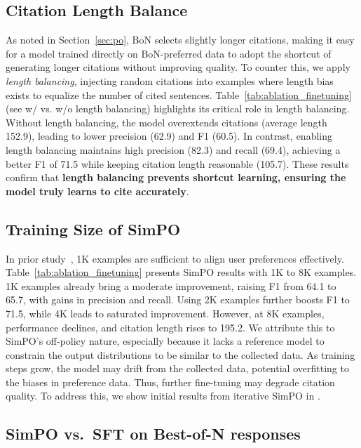 

\subsection{Citation Length Balance}
\label{sec:balance}

As noted in Section~\ref{sec:po}, BoN selects slightly longer citations, making it easy for a model trained directly on BoN-preferred data to adopt the shortcut of generating longer citations without improving quality. To counter this, we apply \emph{length balancing}, injecting random citations into examples where length bias exists to equalize the number of cited sentences. Table~\ref{tab:ablation_finetuning} (see w/ vs. w/o length balancing) highlights its critical role in length balancing. Without length balancing, the model overextends citations (average length 152.9), leading to lower precision (62.9) and F1 (60.5). In contrast, enabling length balancing maintains high precision (82.3) and recall (69.4), achieving a better F1 of 71.5 while keeping citation length reasonable (105.7). These results confirm that \textbf{length balancing prevents shortcut learning, ensuring the model truly learns to cite accurately}.

\subsection{Training Size of SimPO}

In prior study~\citep{zhou2023lima}, 1K examples are sufficient to align user preferences effectively. Table~\ref{tab:ablation_finetuning} presents SimPO results with 1K to 8K examples. 1K examples already bring a moderate improvement, raising F1 from 64.1 to 65.7, with gains in precision and recall. Using 2K examples further boosts F1 to 71.5, while 4K leads to saturated improvement. However, at 8K examples, performance declines, and citation length rises to 195.2. We attribute this to SimPO’s off-policy nature, especially because it lacks a reference model to constrain the output distributions to be similar to the collected data. As training steps grow, the model may drift from the collected data, potential overfitting to the biases in preference data. Thus, further fine-tuning may degrade citation quality. To address this, we show initial results from iterative SimPO in .

\subsection{SimPO vs.\ SFT on Best-of-N responses}

